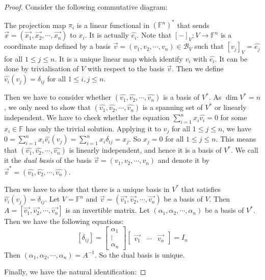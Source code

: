 \documentclass[
	11pt, %
	fleqn, %
	a4paper, %
]{LegrandOrangeBook}
\newcommand{\F}{\mathbb{F}} %
\newcommand{\B}{\mathcal{B}} %
\begin{document}
\begin{proof}
Consider the following commutative diagram:
\begin{center}
\end{center}
The projection map $\pi_i$ is a linear functional in $(\F^n)^*$ that sends $\vec{x} = (\vec{x_1}, \vec{x_2}, \cdots, \vec{x_n})$ to $x_i$. It is actually $\hat{e_i}$. Note that $[-]_V : V \to \F^n$ is a coordinate map defined by a basis $\vec{v} = (v_1, v_2, \cdots, v_n) \in \B_V$ such that $[v_j]_V = \hat{e_j}$ for all $1 \leq j \leq n$. It is a unique linear map which identify $v_i$ with $\hat{e_i}$. It can be done by trivialisation of $V$ with respect to the basis $\vec{v}$. Then we define $\hat{v_i}(v_j) = \delta_{ij}$ for all $1 \leq i, j \leq n$.

Then we have to consider whether $(\hat{v_1}, \hat{v_2}, \cdots, \hat{v_n})$ is a basis of $V^*$. As $\dim{V^*} = n$, we only need to show that $(\hat{v_1}, \hat{v_2}, \cdots, \hat{v_n})$ is a spanning set of $V^*$ or linearly independent. We have to check whether the equation $\sum_{i=1}^n x_i \hat{v_i} = 0$ for some $x_i \in \F$ has only the trivial solution. Applying it to $v_j$ for all $1 \leq j \leq n$, we have $0 = \sum_{i=1}^n x_i \hat{v_i}(v_j) = \sum_{i=1}^n x_i \delta_{ij} = x_j$. So $x_j = 0$ for all $1 \leq j \leq n$. This means that $(\hat{v_1}, \hat{v_2}, \cdots, \hat{v_n})$ is linearly independent, and hence it is a basis of $V^*$. We call it the \emph{dual basis} of the basis $\vec{v} = (v_1, v_2, \cdots, v_n)$ and denote it by $\vec{v}^* = (\hat{v_1}, \hat{v_2}, \cdots, \hat{v_n})$. 

Then we have to show that there is a unique basis in $V^*$ that satisfies $\hat{v_i}(v_j) = \delta_{ij}$. Let $V = \F^n$ and $\vec{v} = (\vec{v_1}, \vec{v_2}, \cdots, \vec{v_n})$ be a basis of $V$. Then $A = [\vec{v_1}, \vec{v_2}, \cdots, \vec{v_n}]$ is an invertible matrix. Let $(\alpha_1, \alpha_2, \cdots, \alpha_n)$ be a basis of $V^*$. Then we have the following equations:
\[
    [ \delta_{ij} ] = \begin{bmatrix}
        \alpha_1 \\
        \vdots \\
        \alpha_n
    \end{bmatrix} \begin{bmatrix}
        \vec{v_1} & \cdots & \vec{v_n}
    \end{bmatrix} = I_n
\]
Then $(\alpha_1, \alpha_2, \cdots, \alpha_n) = A^{-1}$. So the dual basis is unique.

Finally, we have the natural identification:
\end{proof}
\end{document}
